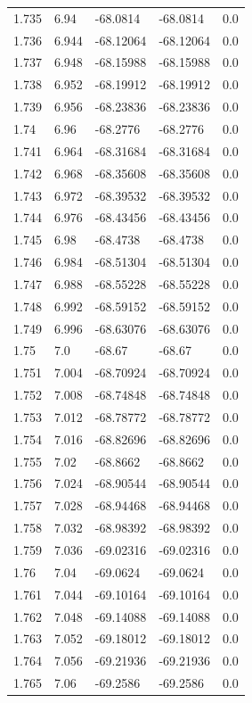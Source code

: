 \begin{tabular}{lllll}
1.735 & 6.94 & -68.0814 & -68.0814 & 0.0 \\
1.736 & 6.944 & -68.12064 & -68.12064 & 0.0 \\
1.737 & 6.948 & -68.15988 & -68.15988 & 0.0 \\
1.738 & 6.952 & -68.19912 & -68.19912 & 0.0 \\
1.739 & 6.956 & -68.23836 & -68.23836 & 0.0 \\
1.74 & 6.96 & -68.2776 & -68.2776 & 0.0 \\
1.741 & 6.964 & -68.31684 & -68.31684 & 0.0 \\
1.742 & 6.968 & -68.35608 & -68.35608 & 0.0 \\
1.743 & 6.972 & -68.39532 & -68.39532 & 0.0 \\
1.744 & 6.976 & -68.43456 & -68.43456 & 0.0 \\
1.745 & 6.98 & -68.4738 & -68.4738 & 0.0 \\
1.746 & 6.984 & -68.51304 & -68.51304 & 0.0 \\
1.747 & 6.988 & -68.55228 & -68.55228 & 0.0 \\
1.748 & 6.992 & -68.59152 & -68.59152 & 0.0 \\
1.749 & 6.996 & -68.63076 & -68.63076 & 0.0 \\
1.75 & 7.0 & -68.67 & -68.67 & 0.0 \\
1.751 & 7.004 & -68.70924 & -68.70924 & 0.0 \\
1.752 & 7.008 & -68.74848 & -68.74848 & 0.0 \\
1.753 & 7.012 & -68.78772 & -68.78772 & 0.0 \\
1.754 & 7.016 & -68.82696 & -68.82696 & 0.0 \\
1.755 & 7.02 & -68.8662 & -68.8662 & 0.0 \\
1.756 & 7.024 & -68.90544 & -68.90544 & 0.0 \\
1.757 & 7.028 & -68.94468 & -68.94468 & 0.0 \\
1.758 & 7.032 & -68.98392 & -68.98392 & 0.0 \\
1.759 & 7.036 & -69.02316 & -69.02316 & 0.0 \\
1.76 & 7.04 & -69.0624 & -69.0624 & 0.0 \\
1.761 & 7.044 & -69.10164 & -69.10164 & 0.0 \\
1.762 & 7.048 & -69.14088 & -69.14088 & 0.0 \\
1.763 & 7.052 & -69.18012 & -69.18012 & 0.0 \\
1.764 & 7.056 & -69.21936 & -69.21936 & 0.0 \\
1.765 & 7.06 & -69.2586 & -69.2586 & 0.0 \\

\end{tabular}
